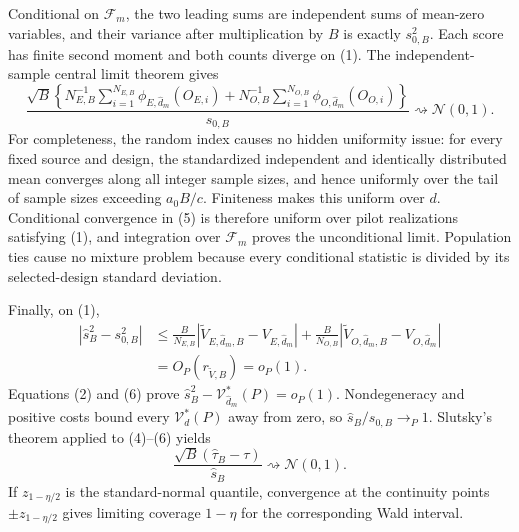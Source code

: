 Conditional on \(\mathcal F_m\), the two leading sums are independent sums of mean-zero variables, and their variance after multiplication by \(B\) is exactly \(s_{0,B}^2\).  Each score has finite second moment and both counts diverge on (1).  The independent-sample central limit theorem gives
\[
 \frac{\sqrt B\left\{
 N_{E,B}^{-1}\sum_{i=1}^{N_{E,B}}\phi_{E,\widehat d_m}(O_{E,i})
 +N_{O,B}^{-1}\sum_{i=1}^{N_{O,B}}\phi_{O,\widehat d_m}(O_{O,i})\right\}}
 {s_{0,B}}\rightsquigarrow\mathcal N(0,1). \tag{5}
\]
For completeness, the random index causes no hidden uniformity issue: for every fixed source and design, the standardized independent and identically distributed mean converges along all integer sample sizes, and hence uniformly over the tail of sample sizes exceeding \(a_0B/c\).  Finiteness makes this uniform over \(d\).  Conditional convergence in (5) is therefore uniform over pilot realizations satisfying (1), and integration over \(\mathcal F_m\) proves the unconditional limit.  Population ties cause no mixture problem because every conditional statistic is divided by its selected-design standard deviation.

Finally, on (1),
\[
\begin{aligned}
 |\widehat s_B^2-s_{0,B}^2|
 &\le \frac B{N_{E,B}}|\widetilde V_{E,\widehat d_m,B}-V_{E,\widehat d_m}|
 +\frac B{N_{O,B}}|\widetilde V_{O,\widehat d_m,B}-V_{O,\widehat d_m}|\\
 &=O_P(r_{\widetilde V,B})=o_P(1). 
\end{aligned} \tag{6}
\]
Equations (2) and (6) prove \(\widehat s_B^2-\mathcal V_{\widehat d_m}^*(P)=o_P(1)\).  Nondegeneracy and positive costs bound every \(\mathcal V_d^*(P)\) away from zero, so \(\widehat s_B/s_{0,B}\to_P1\).  Slutsky's theorem applied to (4)--(6) yields
\[
 \frac{\sqrt B(\widehat\tau_B-\tau)}{\widehat s_B}
 \rightsquigarrow\mathcal N(0,1).
\]
If \(z_{1-\eta/2}\) is the standard-normal quantile, convergence at the continuity points \(\pm z_{1-\eta/2}\) gives limiting coverage \(1-\eta\) for the corresponding Wald interval.